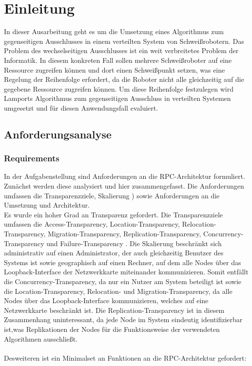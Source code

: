 %
\chapter{Einleitung}

In dieser Ausarbeitung geht es um die Umsetzung eines Algorithmus zum gegenseitigen Ausschlusses in einem
verteilten System von Schweißrobotern. Das Problem des wechselseitigen Ausschlusses 
ist ein weit verbreitetes Problem der Informatik. In diesem konkreten Fall sollen mehrere Schweißroboter
auf eine Ressource zugreifen können und dort einen Schweißpunkt setzen, was eine Regelung der Reihenfolge
erfordert, da die Roboter nicht alle gleichzeitig auf die gegebene Ressource zugreifen können. Um diese Reihenfolge
festzulegen wird Lamports Algorithmus \citep{lamport} zum gegenseitigen Ausschluss in verteilten Systemen umgesetzt
und für diesen Anwendungsfall evaluiert.

\section{Anforderungsanalyse}

\subsection{Requirements}
\label{requirements}

In der Aufgabenstellung sind Anforderungen an die RPC-Architektur formuliert.
Zunächst werden diese analysiert und hier zusammengefasst.
Die Anforderungen umfassen die Transparenzziele, Skalierung \cite{tanenbaumvansteen}) sowie Anforderungen
an die Umsetzung und Architektur.\\
Es wurde ein hoher Grad an Transparenz gefordert.
Die Transparenzziele umfassen die Access-Transparency, Location-Transparency, Relocation-Transparency,
Migration-Transparency, Replication-Transparency, Concurrency-Transparency und Failure-Transparency \citep{tanenbaumvansteen}.
Die Skalierung beschränkt sich administrativ auf einen Administrator, der auch gleichzeitig
Benutzer des Systems ist sowie geographisch auf einen Rechner, auf dem alle Nodes 
\citep{tanenbaumvansteen} über das Loopback-Interface der Netzwerkkarte miteinander kommunizieren.
Somit entfällt die Concurrency-Transparency, da nur ein Nutzer am System beteiligt ist sowie die
Location-Transparency, Relocation- und Migration-Transparency, da alle Nodes über das Loopback-Interface
kommunizieren, welches auf eine Netzwerkkarte beschränkt ist. Die Replication-Transparency ist in diesem Zusammenhang 
uninteressant, da jede Node im System eindeutig identifizierbar ist,was Replikationen der Nodes für die Funktionsweise 
der verwendeten Algorithmen ausschließt.\\\\
Desweiteren ist ein Minimalset an Funktionen an die RPC-Architektur gefordert:

